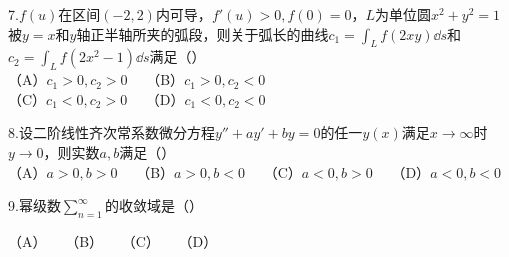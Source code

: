 7.$f(u)$在区间$(-2,2)$内可导，$f'(u)>0,f(0)=0$，$L$为单位圆$x^2+y^2=1$被$y=x$和$y$轴正半轴所夹的弧段，则关于弧长的曲线$c_1=\int_{L}f(2xy)\dd{s}$和$c_2=\int_{L}f(2x^2-1)\dd{s}$满足（）\\
（A）$c_1>0,c_2>0\quad$ （B）$c_1>0,c_2<0$\\
 （C）$c_1<0,c_2>0\quad$ （D）$c_1<0,c_2<0$

8.设二阶线性齐次常系数微分方程$y''+ay'+by=0$的任一$y(x)$满足$x \to \infty$时$y \to 0$，则实数$a,b$满足（）\\
（A）$a>0,b>0\quad$ （B）$a>0,b<0\quad$ （C）$a<0,b>0\quad$ （D）$a<0,b<0$

9.幂级数$\displaystyle \sum_{n=1}^{\infty}$的收敛域是（）





（A）$\quad$ （B）$\quad$ （C）$\quad$ （D）




